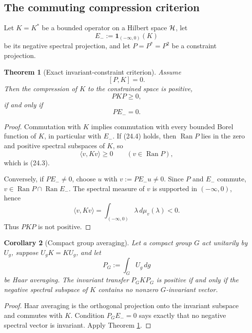 \documentclass[11pt]{article}
\newtheorem{theorem}{Theorem}[section]
\newtheorem{corollary}[theorem]{Corollary}
\theoremstyle{remark}
\begin{document}
\subsection{The commuting compression criterion}

Let \(K=K^*\) be a bounded operator on a Hilbert space \({\cal H}\), let
\[
 E_-:=\mathbf 1_{(-\infty,0)}(K)                               \tag{24.1}
\]
be its negative spectral projection, and let \(P=P^*=P^2\) be a constraint
projection.

\begin{theorem}[Exact invariant-constraint criterion]
\label{thm:v19v21-compression}
Assume
\[
 [P,K]=0.                                                       \tag{24.2}
\]
Then the compression of \(K\) to the constrained space is positive,
\[
 PKP\geq0,                                                      \tag{24.3}
\]
if and only if
\[
 PE_-=0.                                                        \tag{24.4}
\]
\end{theorem}

\begin{proof}
Commutation with \(K\) implies commutation with every bounded Borel
function of \(K\), in particular with \(E_-\).  If (24.4) holds, then
\(\operatorname{Ran}P\) lies in the zero and positive spectral subspaces of
\(K\), so
\[
 \langle v,Kv\rangle\geq0\qquad(v\in\operatorname{Ran}P),
\]
which is (24.3).

Conversely, if \(PE_-\neq0\), choose \(u\) with
\(v:=PE_-u\neq0\).  Since \(P\) and \(E_-\) commute,
\(v\in\operatorname{Ran}P\cap\operatorname{Ran}E_-\).  The spectral
measure of \(v\) is supported in \((-\infty,0)\), hence
\[
 \langle v,Kv\rangle
 =\int_{(-\infty,0)}\lambda\,d\mu_v(\lambda)<0.                \tag{24.5}
\]
Thus \(PKP\) is not positive.
\end{proof}

\begin{corollary}[Compact group averaging]
\label{cor:v19v21-group}
Let a compact group \(G\) act unitarily by \(U_g\), suppose
\(U_gK=KU_g\), and let
\[
 P_G:=\int_GU_g\,dg                                             \tag{24.6}
\]
be Haar averaging.  The invariant transfer \(P_GKP_G\) is positive if and
only if the negative spectral subspace of \(K\) contains no nonzero
\(G\)-invariant vector.
\end{corollary}

\begin{proof}
Haar averaging is the orthogonal projection onto the invariant subspace
and commutes with \(K\).  Condition \(P_GE_-=0\) says exactly that no
negative spectral vector is invariant.  Apply Theorem
\ref{thm:v19v21-compression}.
\end{proof}
\end{document}
